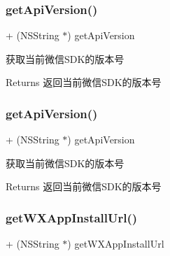 \subsubsection{\texorpdfstring{get\+Api\+Version()}{getApiVersion()}\hspace{0.1cm}{\footnotesize\ttfamily [2/3]}}
{\footnotesize\ttfamily + (N\+S\+String $\ast$) get\+Api\+Version \begin{DoxyParamCaption}{ }\end{DoxyParamCaption}}



获取当前微信\+S\+D\+K的版本号 

\begin{DoxyReturn}{Returns}
返回当前微信\+S\+D\+K的版本号 
\end{DoxyReturn}
\mbox{\label{interface_w_x_api_a5995d42d92822722f7ebf11663db2d33}} 
\subsubsection{\texorpdfstring{get\+Api\+Version()}{getApiVersion()}\hspace{0.1cm}{\footnotesize\ttfamily [3/3]}}
{\footnotesize\ttfamily + (N\+S\+String $\ast$) get\+Api\+Version \begin{DoxyParamCaption}{ }\end{DoxyParamCaption}}



获取当前微信\+S\+D\+K的版本号 

\begin{DoxyReturn}{Returns}
返回当前微信\+S\+D\+K的版本号 
\end{DoxyReturn}
\mbox{\label{interface_w_x_api_a5e8a0217bef24a40c7d2edd9b3c5cdb9}} 
\subsubsection{\texorpdfstring{get\+W\+X\+App\+Install\+Url()}{getWXAppInstallUrl()}\hspace{0.1cm}{\footnotesize\ttfamily [1/3]}}
{\footnotesize\ttfamily + (N\+S\+String $\ast$) get\+W\+X\+App\+Install\+Url \begin{DoxyParamCaption}{ }\end{DoxyParamCaption}}



